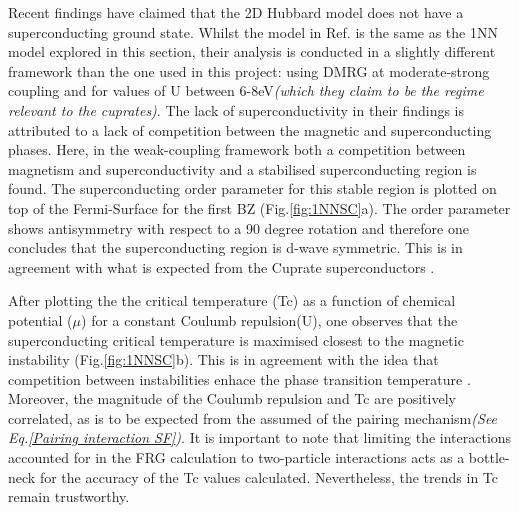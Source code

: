 \documentclass[12pt]{article}
\begin{document}
Recent findings have claimed that the 2D Hubbard model does not have a superconducting ground state\cite{qin2020absence}. 
Whilst the model in Ref. \cite{qin2020absence} is the same as the 1NN model explored in this section, their analysis is conducted in a 
slightly different framework than the one used in this project: using DMRG \cite{white1992density} 
at moderate-strong coupling and for values of U between 6-8eV\textit{(which they claim to be the 
regime relevant to the cuprates)}.
The lack of superconductivity in their findings is attributed to a lack of competition 
between the magnetic and superconducting phases. Here, in the weak-coupling framework both a competition between magnetism and superconductivity and 
a stabilised superconducting region is found. The superconducting order parameter for this stable region is plotted on top of the Fermi-Surface for the first BZ (Fig.\ref{fig:1NNSC}a).
The order parameter shows antisymmetry with respect to a 90 degree rotation and therefore one concludes that
the superconducting region is d-wave symmetric. This is in agreement with what is expected from the Cuprate superconductors \cite{tsuei2000pairing}.\par
\medskip
\noindent 
After plotting the the critical temperature (Tc) as a function of chemical potential ($\mu$) for a constant Coulumb repulsion(U), one observes that
the superconducting critical temperature is maximised closest to the magnetic instability (Fig.\ref{fig:1NNSC}b).
This is in agreement with the idea that competition between instabilities
enhace the phase transition temperature \cite{maple1995interplay,sun2016dome}. Moreover, the magnitude of the Coulumb repulsion and Tc are positively correlated, as is to be expected from the assumed of the pairing mechanism\textit{(See Eq.\ref{Pairing interaction SF})}.
It is important to note that limiting the interactions 
accounted for in the FRG calculation to two-particle interactions acts as a bottle-neck for the accuracy 
of the Tc values calculated. Nevertheless, the trends in Tc remain trustworthy. 
\end{document}
